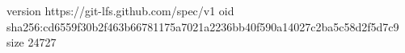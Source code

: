 version https://git-lfs.github.com/spec/v1
oid sha256:cd6559f30b2f463b66781175a7021a2236bb40f590a14027c2ba5c58d2f5d7c9
size 24727
